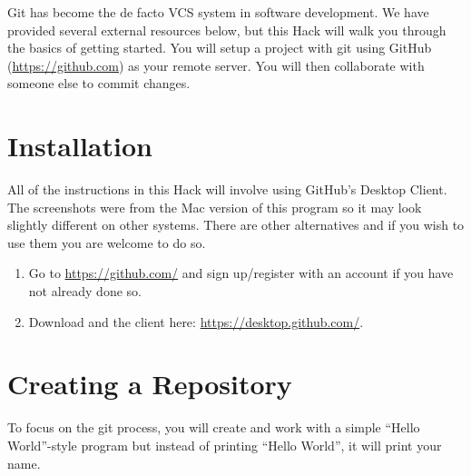 \documentclass[12pt]{scrartcl}
\begin{document}
Git has become the de facto VCS system in software development.  We have
provided several external resources below, but this Hack will walk you
through the basics of getting started.  You will setup a project with 
git using GitHub (\url{https://github.com}) as your remote server.  You
will then collaborate with someone else to commit changes.

\section{Installation}

All of the instructions in this Hack will involve using GitHub's 
Desktop Client.  The screenshots were from the Mac version of this
program so it may look slightly different on other systems.  There 
are other alternatives and if you wish to use them you are welcome 
to do so.

\begin{enumerate}
  \item Go to \url{https://github.com/} and sign up/register with
  an account if you have not already done so.
  \item Download and the client here: \url{https://desktop.github.com/}.
\end{enumerate}

\section{Creating a Repository}

To focus on the git process, you will create and work with a simple
``Hello World''-style program but instead of printing ``Hello World'', 
it will print your name. 
\end{document}
